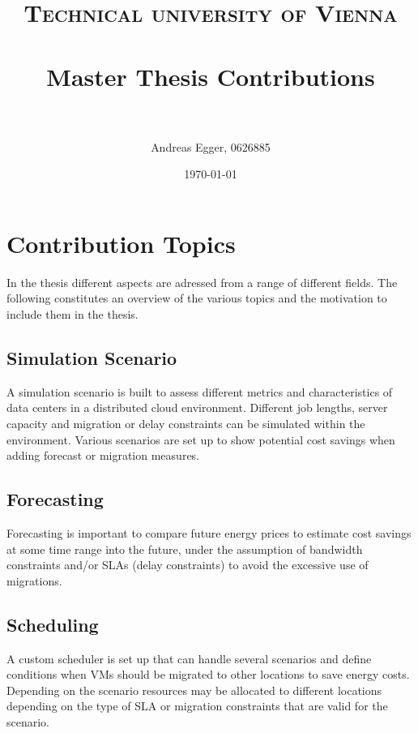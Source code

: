 \documentclass[paper=a4, fontsize=11pt]{scrartcl} %
\title{	
\normalfont \normalsize 
\textsc{Technical university of Vienna} \\ [25pt] %
\horrule{0.5pt} \\[0.4cm] %
\huge Master Thesis Contributions \\ %
\horrule{2pt} \\[0.5cm] %
}
\author{Andreas Egger, 0626885} %
\date{\normalsize\today} %
\numberwithin{equation}{section} %
\numberwithin{figure}{section} %
\numberwithin{table}{section} %
\begin{document}
\maketitle %


\section{Contribution Topics}

In the thesis different aspects are adressed from a range of different fields. The following constitutes an overview of the various topics and the motivation to include them in the thesis. 


\subsection{Simulation Scenario}

A simulation scenario is built to assess different metrics and characteristics of data centers in a distributed cloud environment. Different job lengths, server capacity and migration or delay constraints can be simulated within the environment. Various scenarios are set up to show potential cost savings when adding forecast or migration measures.  


\subsection{Forecasting}

Forecasting is important to compare future energy prices to estimate cost savings at some time range into the future, under the assumption of bandwidth constraints and/or SLAs (delay constraints) to avoid the excessive use of migrations. 


\subsection{Scheduling}

A custom scheduler is set up that can handle several scenarios and define conditions when VMs should be migrated to other locations to save energy costs. 
Depending on the scenario resources may be allocated to different locations depending on the type of SLA or migration constraints that are valid for the scenario. 
\end{document}
